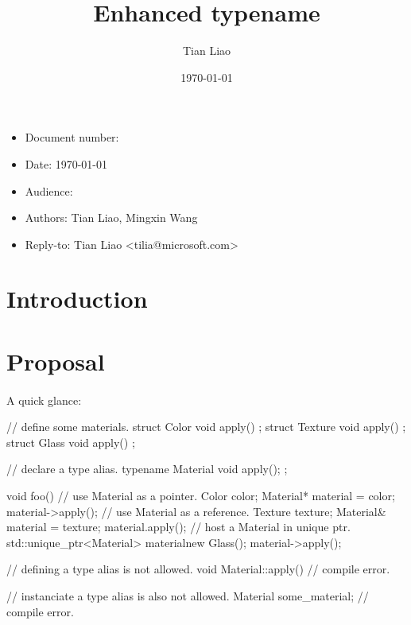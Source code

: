 \documentclass{article}
\title{Enhanced typename}
\author{Tian Liao}
\date{\today}
\begin{document}
\maketitle
\vfill
\begin{itemize}[noitemsep]
  \item[] Document number:
  \item[] Date: \today
  \item[] Audience:
  \item[] Authors: Tian Liao, Mingxin Wang
  \item[] Reply-to: Tian Liao \textless tilia@microsoft.com\textgreater
\end{itemize}

\newpage
{}

\section{Introduction}

\section{Proposal}

\paragraph{}
A quick glance:
\begin{codeblock}
// define some materials.
struct Color { void apply() {} };
struct Texture { void apply() {} };
struct Glass { void apply() {} };

// declare a type alias.
typename Material { void apply(); };

void foo() {
  {
    // use Material as a pointer.
    Color color;
    Material* material = color;
    material->apply();
  }
  {
    // use Material as a reference.
    Texture texture;
    Material& material = texture;
    material.apply();
  }
  {
    // host a Material in unique ptr.
    std::unique_ptr<Material> material{new Glass()};
    material->apply();
  }
}

// defining a type alias is not allowed.
void Material::apply() {} // compile error.

// instanciate a type alias is also not allowed.
Material some_material; // compile error.

\end{codeblock}
\end{document}
